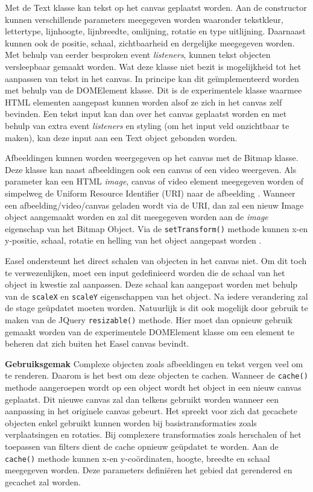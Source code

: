 Met de Text klasse kan tekst op het canvas geplaatst worden. Aan de constructor kunnen verschillende parameters meegegeven worden waaronder tekstkleur, lettertype, lijnhoogte, lijnbreedte, omlijning, rotatie en type uitlijning. Daarnaast kunnen ook de positie, schaal, zichtbaarheid en dergelijke meegegeven worden. Met behulp van eerder besproken event \textit{listeners}, kunnen tekst objecten versleepbaar gemaakt worden. Wat deze klasse niet bezit is mogelijkheid tot het aanpassen van tekst in het canvas. In principe kan dit ge\"{i}mplementeerd worden met behulp van de DOMElement klasse. Dit is de experimentele klasse waarmee HTML elementen aangepast kunnen worden alsof ze zich in het canvas zelf bevinden. Een tekst input kan dan over het canvas geplaatst worden en met behulp van extra event \textit{listeners} en styling (om het input veld onzichtbaar te maken), kan deze input aan een Text object gebonden worden. 

Afbeeldingen kunnen worden weergegeven op het canvas met de Bitmap klasse. Deze klasse kan naast afbeeldingen ook een canvas of een video weergeven. Als parameter kan een HTML \textit{image}, canvas of video element meegegeven worden of simpelweg de Uniform Resource Identifier (URI) naar de afbeelding \cite{URI}. Wanneer een afbeelding/video/canvas geladen wordt via de URI, dan zal een nieuw Image object aangemaakt worden en zal dit meegegeven worden aan de \textit{image} eigenschap van het Bitmap Object. Via de \lstinline{setTransform()} methode kunnen x-en y-positie, schaal, rotatie en helling van het object aangepast worden \cite{EaselDocs}. 

Easel ondersteunt het direct schalen van objecten in het canvas niet. Om dit toch te verwezenlijken, moet een input gedefinieerd worden die de schaal van het object in kwestie zal aanpassen. Deze schaal kan aangepast worden met behulp van de \lstinline{scaleX} en \lstinline{scaleY} eigenschappen van het object. Na iedere verandering zal de stage ge\"{u}pdatet moeten worden. Natuurlijk is dit ook mogelijk door gebruik te maken van de JQuery \lstinline{resizable()} methode. Hier moet dan opnieuw gebruik gemaakt worden van de experimentele DOMElement klasse om een element te beheren dat zich buiten het Easel canvas bevindt. 

\textbf{Gebruiksgemak} \break
Complexe objecten zoals afbeeldingen en tekst vergen veel om te renderen. Daarom is het best om deze objecten te cachen. Wanneer de \lstinline{cache()} methode aangeroepen wordt op een object wordt het object in een nieuw canvas geplaatst. Dit nieuwe canvas zal dan telkens gebruikt worden wanneer een aanpassing in het originele canvas gebeurt. Het spreekt voor zich dat gecachete objecten enkel gebruikt kunnen worden bij basistransformaties zoals verplaatsingen en rotaties. Bij complexere transformaties zoals herschalen of het toepassen van filters dient de cache opnieuw ge\"{u}pdatet te worden. Aan de \lstinline{cache()} methode kunnen x-en y-co\"{o}rdinaten, hoogte, breedte en schaal meegegeven worden. Deze parameters defini\"{e}ren het gebied dat gerendered en gecachet zal worden. 

